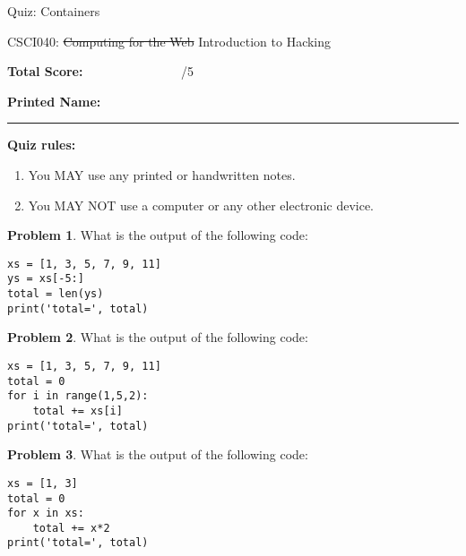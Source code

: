 \documentclass[10pt]{article}
\theoremstyle{definition}
\newtheorem{problem}{Problem}
\begin{document}
\begin{center}
    {
\Large
Quiz: Containers
}

    \vspace{0.1in}
    CSCI040: \sout{Computing for the Web} Introduction to Hacking

    \vspace{0.1in}
\end{center}

\vspace{0.15in}
\noindent
\textbf{Total Score:} ~~~~~~~~~~~~~~~/5

\vspace{0.5in}
\noindent
\textbf{Printed Name:}

\noindent
\rule{\textwidth}{0.1pt}
\vspace{0.25in}

\noindent
\textbf{Quiz rules:}
\begin{enumerate}
    \item You MAY use any printed or handwritten notes.
    \item You MAY NOT use a computer or any other electronic device.
\end{enumerate}

\noindent

\vspace{0.15in}


\begin{problem}
    What is the output of the following code:
\end{problem}
\begin{lstlisting}
xs = [1, 3, 5, 7, 9, 11]
ys = xs[-5:]
total = len(ys)
print('total=', total)
\end{lstlisting}
\vspace{2in}

\begin{problem}
    What is the output of the following code:
\end{problem}
\begin{lstlisting}
xs = [1, 3, 5, 7, 9, 11]
total = 0
for i in range(1,5,2):
    total += xs[i]
print('total=', total)
\end{lstlisting}
\vspace{2in}

\begin{problem}
    What is the output of the following code:
\end{problem}
\begin{lstlisting}
xs = [1, 3]
total = 0
for x in xs:
    total += x*2
print('total=', total)
\end{lstlisting}
\vspace{1.5in}
\end{document}
